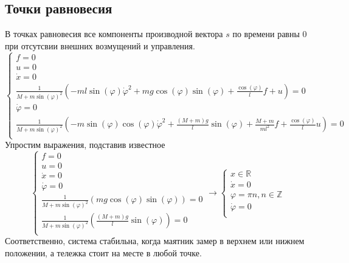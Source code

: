 \FloatBarrier
\subsection{Точки равновесия}
В точках равновесия все компоненты производной вектора \(s\) по времени равны $0$ при отсутсвии внешних возмущений и управления.
\[
  \begin{cases}
    f = 0 \\
    u = 0 \\
    \dot x = 0\\
    \frac{1}{M + m\sin(\varphi)^2}( -ml\sin(\varphi)\dot{\varphi}^2 + mg\cos(\varphi)\sin(\varphi) + \frac{\cos(\varphi)}{l}f + u ) = 0\\
    \dot \varphi = 0\\
    \frac{1}{M + m\sin(\varphi)^2}( -m\sin(\varphi)\cos(\varphi)\dot{\varphi}^2 + \frac{(M+m)g}{l}\sin(\varphi) + \frac{M+m}{ml^2}f + \frac{\cos(\varphi)}{l}u ) = 0\\
  \end{cases}
\]
Упростим выражения, подставив известное
\[
  \begin{cases}
    f = 0 \\
    u = 0 \\
    \dot x = 0\\
    \dot \varphi = 0\\
    \frac{1}{M + m\sin(\varphi)^2}(mg\cos(\varphi)\sin(\varphi)) = 0\\
    \frac{1}{M + m\sin(\varphi)^2}(\frac{(M+m)g}{l}\sin(\varphi)) = 0\\
  \end{cases} \rightarrow
  \begin{cases}
    x \in \mathds{R} \\
    \dot x = 0\\
    \varphi = \pi n, n \in \mathds{Z}\\
    \dot \varphi = 0\\
  \end{cases}
\]
Соответственно, система стабильна, когда маятник замер в верхнем или нижнем положении, а тележка стоит на месте в любой точке.

